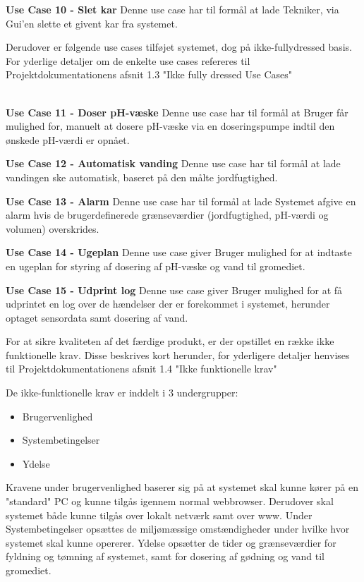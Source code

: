 \textbf{Use Case 10 - Slet kar}\newline
Denne use case har til formål at lade Tekniker, via Gui'en slette et givent kar fra systemet.\newline


Derudover er følgende use cases tilføjet systemet, dog på ikke-fullydressed basis. For yderlige detaljer om de enkelte use cases refereres til Projektdokumentationens afsnit 1.3 "Ikke fully dressed Use Cases"\\\

\textbf{Use Case 11 - Doser pH-væske}\newline
Denne use case har til formål at Bruger får mulighed for, manuelt at dosere pH-væske via en doseringspumpe indtil den
ønskede pH-værdi er opnået.\newline

\textbf{Use Case 12 - Automatisk vanding}\newline 
Denne use case har til formål at lade vandingen ske automatisk, baseret på den målte jordfugtighed.\newline

\textbf{Use Case 13 - Alarm}\newline 
Denne use case har til formål at lade Systemet afgive en alarm hvis de brugerdefinerede grænseværdier (jordfugtighed, pH-værdi og volumen) overskrides.\newline

\textbf{Use Case 14 - Ugeplan}\newline
Denne use case giver Bruger mulighed for at indtaste en ugeplan for styring af dosering af pH-væske
og vand til gromediet.\newline

\textbf{Use Case 15 - Udprint log}\newline 
Denne use case giver Bruger mulighed for at få udprintet en log over de hændelser der er forekommet i systemet, herunder optaget sensordata samt dosering af vand.\newline


For at sikre kvaliteten af det færdige produkt, er der opstillet en række ikke funktionelle krav. Disse beskrives kort herunder, for yderligere detaljer henvises til Projektdokumentationens afsnit 1.4 "Ikke funktionelle krav"

De ikke-funktionelle krav er inddelt i 3 undergrupper: 

\begin{itemize}
	\item	Brugervenlighed
	\item	Systembetingelser
	\item	Ydelse
\end{itemize}

Kravene under brugervenlighed baserer sig på at systemet skal kunne kører på en "standard" PC og kunne tilgås igennem normal webbrowser. Derudover skal systemet både kunne tilgås over lokalt netværk samt over www.\newline
Under Systembetingelser opsættes de miljømæssige omstændigheder under hvilke hvor systemet skal kunne opererer.\newline 
Ydelse opsætter de tider og grænseværdier for fyldning og tømning af systemet, samt for dosering af gødning og vand til gromediet.